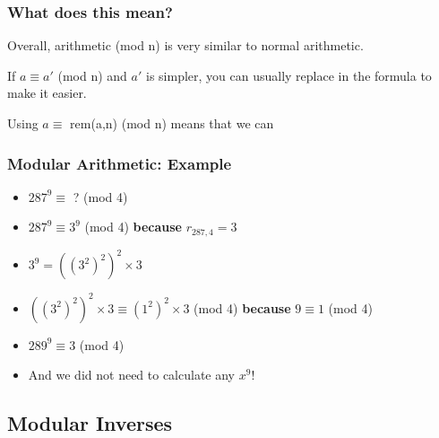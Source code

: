 \documentclass{beamer}
\begin{document}
\begin{frame}
  \frametitle{What does this mean?}

  {\larger
  \begin{center}
    Overall, arithmetic (mod n) is very similar to normal arithmetic.

    \bigskip

    If $a \equiv a'$ (mod n) and $a'$ is simpler,
    you can \alert{usually} replace in the formula to make it easier.

    \bigskip

    Using $a \equiv$ rem(a,n) (mod n) means that we can
  \end{center}
  }
\end{frame}

\begin{frame}
  \frametitle{Modular Arithmetic: Example}

  {\larger
    \begin{itemize}
    \item {} $287^9 \equiv$ ? (mod 4)
    \item<2-> $287^9 \equiv 3^9$ (mod 4) {\bf because} $r_{287,4} = 3$
    \item<3-> $3^9 = ((3^2)^2)^2 \times 3$
    \item<3-> $((3^2)^2)^2\times 3 \equiv (1^2)^2 \times 3$ (mod 4)
      {\bf because} $9 \equiv 1$ (mod 4)
    \item<4-> $289^9 \equiv 3$ (mod 4)

      \vfill

    \item<4-> And we did not need to calculate any $x^9$!
      
    \end{itemize}
      
  }
\end{frame}

\subsection{Modular Inverses}
\end{document}
